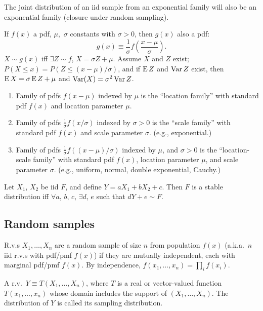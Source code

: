 \documentclass[8pt,letterpaper, landscape]{extarticle} %
\begin{document}
\begin{multicols}{3}
\begin{description}
The joint distribution of an iid sample from an exponential family will also be an exponential family (closure under random sampling).

 If $ f(x) $ a pdf, $ \mu, $ $ \sigma $ constants with $ \sigma > 0 $, then $ g(x) $ also a pdf: $$ g(x) \equiv \frac{1}{\sigma} f \left( \frac{x - \mu}{\sigma} \right). $$
$ X \sim g(x) $ iff $ \exists Z \sim f $, $ X = \sigma Z + \mu $. Assume $ X $ and $ Z $ exist; $ P (X \leq x) = P (Z \leq (x - \mu)/\sigma) $, and if $ \operatorname{E} Z $ and $ \operatorname{Var} Z  $ exist, then $ \operatorname{E} X = \sigma \operatorname{E} Z + \mu $ and $ \operatorname{Var} (X) = \sigma^2 \operatorname{Var} Z $.
\begin{enumerate}
\item Family of pdfs $ f(x - \mu) $ indexed by $ \mu $ is the ``location family'' with standard pdf $ f(x) $ and location parameter $ \mu $.
\item Family of pdfs $ \frac{1}{\sigma} f(x / \sigma) $ indexed by $ \sigma > 0 $ is the ``scale family'' with standard pdf $ f(x) $ and scale parameter $ \sigma $. (e.g., exponential.)
\item Family of pdfs $ \frac{1}{\sigma} f((x - \mu) / \sigma) $ indexed by $ \mu $, and $ \sigma > 0 $ is the ``location-scale family'' with standard pdf $ f(x) $, location parameter $ \mu $, and scale parameter $ \sigma $. (e.g., uniform, normal, double exponential, Cauchy.)
\end{enumerate}

 Let $ X_1 $, $ X_2 $ be iid $ F $, and define $ Y = a X_1 + bX_2 + c $. Then $ F $ is a stable distribution iff $ \forall a $, $ b $, $ c $, $ \exists d $, $ e $ such that $ dY + e \sim F $.

\subsection{Random samples}
 R.v.s $ X_1, \dotsc, X_n $ are a random sample of size $ n $ from population $ f(x) $ (a.k.a.\ $ n $ iid r.v.s with pdf/pmf $ f(x) $) if they are mutually independent, each with marginal pdf/pmf $ f(x) $. By independence, $ f(x_1, \dotsc, x_n) = \prod_i f(x_i) $.

 A r.v.\ $ Y \equiv T (X_1, \dotsc, X_n) $, where $ T $ is a real or vector-valued function $ T(x_1, \dotsc, x_n) $ whose domain includes the support of $ (X_1, \dotsc, X_n) $. The distribution of $ Y $ is called its sampling distribution.


\end{description}
\end{multicols}
\end{document}
